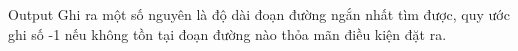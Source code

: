 Output
Ghi ra một số nguyên là độ dài đoạn đường ngắn nhất tìm được, quy ước ghi số -1 nếu không tồn tại đoạn đường nào thỏa mãn điều kiện đặt ra.